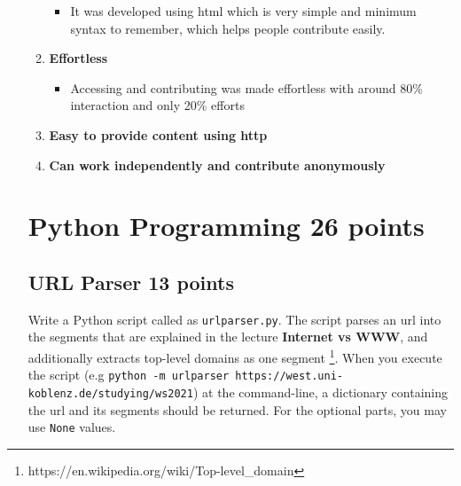 \documentclass{resources/WeSTassignment}
\begin{document}
\begin{enumerate}
\begin{enumerate}
	\begin{itemize}
    		\item It was developed using html which is very simple and minimum syntax to remember, which helps people contribute easily.
	\end{itemize}
    \item \textbf{Effortless}
	\begin{itemize}
    		\item Accessing and contributing was made effortless with around 80\% interaction and only 20\% efforts
	\end{itemize}
    \item \textbf{Easy to provide content using http}
    \item \textbf{Can work independently and contribute anonymously}
\end{enumerate}


\section{Python Programming \hfill{26 points}}
\subsection{URL Parser \hfill{13 points}\label{url_parser}}
Write a Python script called as \texttt{urlparser.py}. The script parses an url into the segments that are explained in the lecture \textbf{Internet vs WWW}, and additionally extracts top-level domains as one segment \footnote{https://en.wikipedia.org/wiki/Top-level\_domain}. When you execute the script (e.g \texttt{python -m urlparser https://west.uni-koblenz.de/studying/ws2021}) at the command-line, a dictionary containing the url and its segments should be returned. For the optional parts, you may use \texttt{None} values. 


\end{enumerate}
\end{document}
